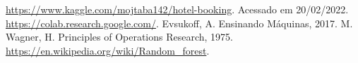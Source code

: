 \documentclass{homework}
\begin{document}
\begin{thebibliography}{1}
     \url{https://www.kaggle.com/mojtaba142/hotel-booking}. Acessado em 20/02/2022.
     \url{https://colab.research.google.com/}.
     Evsukoff, A. Ensinando Máquinas, 2017.
     M. Wagner, H. Principles of Operations Research, 1975.
     \url{https://en.wikipedia.org/wiki/Random_forest}.
\end{thebibliography}
\end{document}
